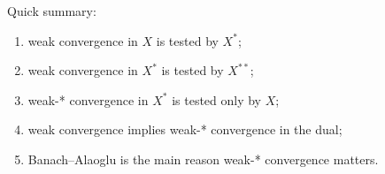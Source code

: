 \documentclass[header={Ancillary Note: Weak vs Weak-*},notheorems]{study-note}
\begin{document}
\begin{focusbox}
Quick summary:
\begin{enumerate}
\item weak convergence in $X$ is tested by $X^*$;
\item weak convergence in $X^*$ is tested by $X^{**}$;
\item weak-* convergence in $X^*$ is tested only by $X$;
\item weak convergence implies weak-* convergence in the dual;
\item Banach--Alaoglu is the main reason weak-* convergence matters.
\end{enumerate}
\end{focusbox}
\end{document}

